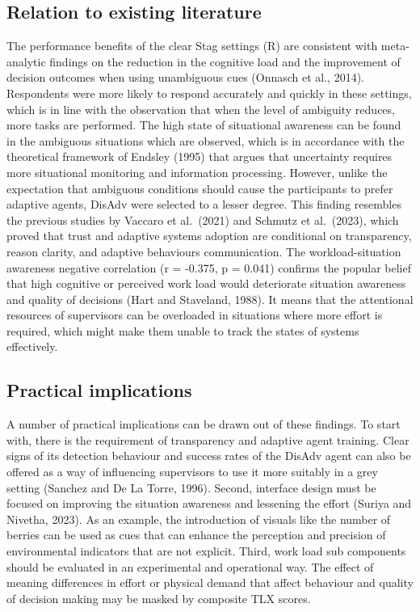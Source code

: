 \documentclass[
]{article}
\begin{document}
\subsection{Relation to existing
literature}\label{relation-to-existing-literature}

The performance benefits of the clear Stag settings (R) are consistent
with meta-analytic findings on the reduction in the cognitive load and
the improvement of decision outcomes when using unambiguous cues
(Onnasch et al., 2014). Respondents were more likely to respond
accurately and quickly in these settings, which is in line with the
observation that when the level of ambiguity reduces, more tasks are
performed. The high state of situational awareness can be found in the
ambiguous situations which are observed, which is in accordance with the
theoretical framework of Endsley (1995) that argues that uncertainty
requires more situational monitoring and information processing.
However, unlike the expectation that ambiguous conditions should cause
the participants to prefer adaptive agents, DisAdv were selected to a
lesser degree. This finding resembles the previous studies by Vaccaro et
al.~(2021) and Schmutz et al.~(2023), which proved that trust and
adaptive systems adoption are conditional on transparency, reason
clarity, and adaptive behaviours communication. The workload-situation
awareness negative correlation (r = -0.375, p = 0.041) confirms the
popular belief that high cognitive or perceived work load would
deteriorate situation awareness and quality of decisions (Hart and
Staveland, 1988). It means that the attentional resources of supervisors
can be overloaded in situations where more effort is required, which
might make them unable to track the states of systems effectively.

\subsection{Practical implications}\label{practical-implications}

A number of practical implications can be drawn out of these findings.
To start with, there is the requirement of transparency and adaptive
agent training. Clear signs of its detection behaviour and success rates
of the DisAdv agent can also be offered as a way of influencing
supervisors to use it more suitably in a grey setting (Sanchez and De La
Torre, 1996). Second, interface design must be focused on improving the
situation awareness and lessening the effort (Suriya and Nivetha, 2023).
As an example, the introduction of visuals like the number of berries
can be used as cues that can enhance the perception and precision of
environmental indicators that are not explicit. Third, work load sub
components should be evaluated in an experimental and operational way.
The effect of meaning differences in effort or physical demand that
affect behaviour and quality of decision making may be masked by
composite TLX scores.
\end{document}
